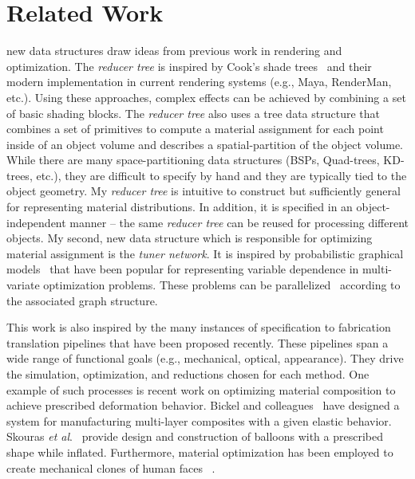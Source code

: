 \chapter{Related Work}
\label{chap:relate}
 new data structures draw ideas from previous work in rendering and optimization.
The \emph{reducer tree} is inspired by Cook's shade trees~\cite{Cook1984} and their modern implementation in current rendering systems (e.g., Maya, RenderMan, etc.). Using these approaches, complex effects can be achieved by combining a set of basic shading blocks. The \emph{reducer tree} also uses a tree data structure that combines a set of primitives to compute a material assignment for each point inside of an object volume and describes a spatial-partition of the object volume. While there are many space-partitioning data structures (BSPs, Quad-trees, KD-trees, etc.), they are difficult to specify by hand and they are typically tied to the object geometry. My \emph{reducer tree} is intuitive to construct but sufficiently general for representing material distributions. In addition, it is specified in an object-independent manner -- the same \emph{reducer tree} can be reused for processing different objects. My second, new data structure which is responsible for optimizing material assignment is the \emph{tuner network}. It is inspired by probabilistic graphical models~\cite{Jordan:1999} that have been popular for representing variable dependence in multi-variate optimization problems. These problems can be parallelized~\cite{GraphLab} according to the associated graph structure.

This work is also inspired by the many instances of specification to fabrication translation pipelines that have been proposed recently. These pipelines span a wide range of functional goals (e.g., mechanical, optical, appearance). They drive the simulation, optimization, and reductions chosen for each method. 
One example of such processes is recent work on optimizing material composition to achieve prescribed deformation behavior. 
Bickel and colleagues~ have designed a system for manufacturing multi-layer composites with a given elastic behavior.
 Skouras \textit{et al}.~ provide design and construction of balloons with a prescribed shape while inflated. Furthermore, material optimization has been employed to create mechanical clones of human faces ~\cite{Bickel:2012}.

